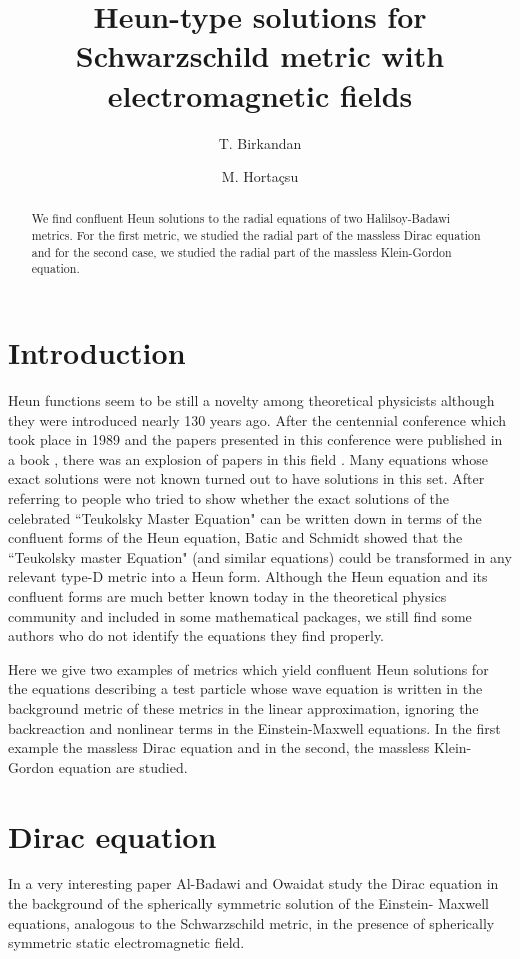 \documentclass{article}
\title{Heun-type solutions for Schwarzschild metric with electromagnetic fields}
\author[1]{T. Birkandan}
\author[2]{M. Horta\c{c}su}
\affil[1]{Istanbul Technical University - Department of Physics, Istanbul, Turkey}
\affil[2]{Mimar Sinan Fine Arts University - Department of Physics, Istanbul, Turkey}
\begin{document}
\maketitle

\begin{abstract}
We find confluent Heun solutions to the radial equations of two Halilsoy-Badawi metrics. For the first metric, we studied the radial part of the massless Dirac equation and for the second case, we studied the radial part of the massless Klein-Gordon equation.
\end{abstract}

\section{Introduction}
Heun functions \cite{Heun, Ronveaux} seem to be still a novelty
among theoretical physicists although they were introduced nearly
130  years ago. After the centennial conference which took place
in 1989 and the papers presented in this conference were published
in a book \cite{Ronveaux}, there was an explosion of papers in
this field \cite{Hortacsu}. Many equations whose exact solutions
were not known turned out to have solutions in this set. After
referring to people \cite{Blaudin,Leaver, Suzuki} who tried to
show whether the exact solutions of the celebrated ``Teukolsky
Master Equation" \cite{Teukolsky} can be written down
in terms of the confluent forms of the Heun equation, Batic and
Schmidt \cite{Batic} showed that the ``Teukolsky master Equation" (and similar equations) could be transformed in any
relevant type-D metric into a Heun form. Although the Heun
equation and its confluent forms are  much better known today in
the theoretical physics community and included in some
mathematical packages, we still find some authors who do not
identify the equations they find properly.

Here we give two examples of metrics which yield confluent Heun
solutions for the equations describing  a test particle
whose wave equation is written in the background metric of these
metrics in the linear approximation, ignoring the backreaction
and nonlinear terms in the Einstein-Maxwell equations.
In the first example the massless Dirac equation and in the second,
the massless Klein-Gordon equation are studied.

\section{Dirac equation}
In a very interesting paper \cite{Badawi} Al-Badawi and Owaidat study the Dirac equation in the background of the spherically symmetric solution of the Einstein- Maxwell equations, analogous to the Schwarzschild metric, in the presence of spherically symmetric static electromagnetic field.
\end{document}
